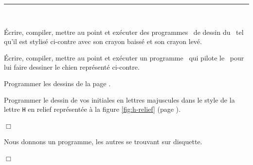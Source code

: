 \noindent \rule{137mm}{0.1mm} %
\begin{exercices}{\ \\

\vspace{-\baselineskip}
\noindent \begin{minipage}[t]{88mm}
\tiret Écrire, compiler, mettre au point et exécuter des programmes \pascal\ de dessin du
\robot\ tel qu'il est stylisé ci-contre avec son
crayon baissé et son crayon levé.
\end{minipage}
\hfill
\begin{minipage}[t]{44mm}
\vspace{2.0cm}
\hspace{-4.4cm}  %
\end{minipage}

\noindent \begin{minipage}[t]{103mm}
\tiret  Écrire, compiler, mettre au point et exécuter un programme \pascal\ qui
pilote le \robot\ pour lui faire dessiner le chien représenté
ci-contre.
\end{minipage}
\hfill
\begin{minipage}[t]{29mm}
\vspace{2.3cm}
\hspace{-2.9cm}  %
\end{minipage}

\noindent \begin{minipage}[t]{103mm}
\tiret  Programmer les dessins de la
pa\-ge \pageref{fig:quadrilateres}.
\end{minipage}

\vspace{1.5mm}

\tiret  Programmer le dessin de vos initiales en lettres majuscules
dans le style de la lettre {\tt H} en relief représentée à la
figure \ref{fig:h-relief} (page \pageref{fig:h-relief}).

\noindent $\Box$}\end{exercices}

\newpage
\begin{corrige}{Nous donnons un programme, les autres se trouvant sur disquette.

\noindent $\Box$}\end{corrige}

